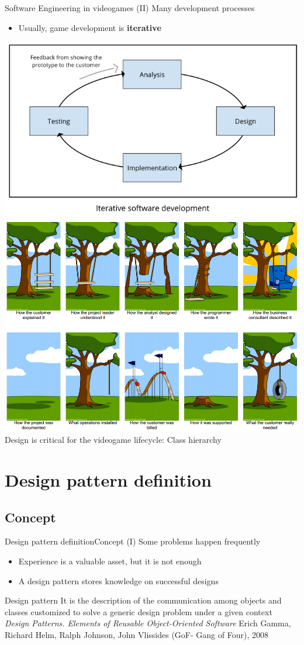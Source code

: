 \documentclass[10pt,compress]{beamer} %
\begin{document}
\begin{frame}{Software Engineering in videogames (II)}
	Many development processes
	\begin{itemize}
		\item Usually, game development is \textbf{iterative}
  	\end{itemize}
	\bigskip
			\centering\includegraphics[width=0.58\linewidth]{figs/iterative}
			\centering\includegraphics[width=0.48\linewidth]{figs/cartoon}\\
	\normalsize{Design is critical for the videogame lifecycle: Class hierarchy}
\end{frame}

\section[Design pattern definition]{Design pattern definition}
\subsection{Concept}
\begin{frame}{Design pattern definition}{Concept (I)}
	Some problems happen frequently
	\begin{itemize}
		\item Experience is a valuable asset, but it is not enough
		\item A \alert{design pattern} stores knowledge on successful designs
  	\end{itemize}
	\begin{block}{Design pattern}
		It is the description of the communication among objects and classes customized to solve a generic design problem under a given context\\
		\scriptsize{\textit{Design Patterns. Elements of Reusable Object-Oriented Software}
		Erich Gamma, Richard Helm, Ralph Johnson, John Vlissides (GoF- Gang of Four), 2008}
	\end{block}
\end{frame}
\end{document}
